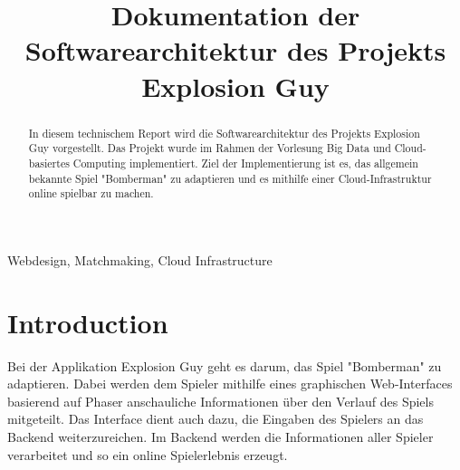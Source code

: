 \documentclass[conference]{IEEEtran}
\begin{document}
\title{Dokumentation der Softwarearchitektur des Projekts Explosion Guy}


\author{
	\and

	\and

	\and

	\and

}

\maketitle

\begin{abstract}
In diesem technischem Report wird die Softwarearchitektur des Projekts 
Explosion Guy vorgestellt. Das Projekt wurde im Rahmen der Vorlesung Big Data und Cloud-basiertes Computing implementiert. Ziel der Implementierung ist es, 
das allgemein bekannte Spiel "Bomberman" zu adaptieren und es mithilfe einer Cloud-Infrastruktur online spielbar zu machen.\\
\end{abstract}

\begin{IEEEkeywords}
 Webdesign, Matchmaking, Cloud Infrastructure
\end{IEEEkeywords}

\section{Introduction}
Bei der Applikation Explosion Guy geht es darum, das Spiel "Bomberman" zu adaptieren. Dabei werden dem Spieler mithilfe eines graphischen Web-Interfaces basierend auf Phaser anschauliche Informationen über den Verlauf des Spiels mitgeteilt. Das Interface dient auch dazu, die Eingaben des Spielers an das Backend weiterzureichen. Im Backend werden die Informationen aller Spieler verarbeitet und so ein online Spielerlebnis erzeugt.
\end{document}
